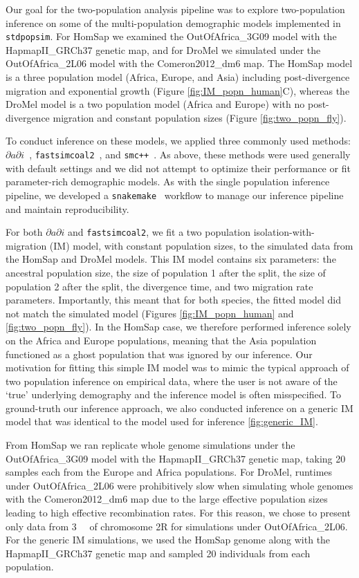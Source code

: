\documentclass[12pt,halfline,a4paper]{ouparticle}
\newcommand{\stdpopsim}{\texttt{stdpopsim}\xspace}
\newcommand{\dadi}{$\partial a \partial i$\xspace}
\newcommand{\smcpp}{\texttt{smc++}\xspace}
\newcommand{\fastsimcoal}{\texttt{fastsimcoal2}\xspace}
\begin{document}
Our goal for the two-population analysis pipeline was to explore two-population inference
on some of the multi-population demographic models implemented in \stdpopsim.
For HomSap we examined the OutOfAfrica\_3G09 model with the HapmapII\_GRCh37 genetic map,
and for DroMel we simulated under the OutOfAfrica\_2L06 model with the Comeron2012\_dm6 map.
The HomSap model is a three population model (Africa, Europe, and Asia) including post-divergence
migration and exponential growth (Figure \ref{fig:IM_popn_human}C), whereas the
DroMel model is a two population model (Africa and Europe) with no post-divergence
migration and constant population sizes (Figure \ref{fig:two_popn_fly}).

To conduct inference on these models, we applied three commonly used methods:
\dadi~\citep{gutenkunst2009inferring}, \fastsimcoal~\citep{excoffier2013robust},
and \smcpp~\citep{terhorst2017robust}. As above, these methods were used
generally with default settings and we did not attempt to optimize their performance or fit
parameter-rich demographic models. As with the single population inference pipeline,
we developed a \texttt{snakemake}~\citep{koster2012snakemake} workflow to manage
our inference pipeline and maintain reproducibility.

For both \dadi and \fastsimcoal, we fit a two population
isolation-with-migration (IM) model, with constant population sizes, to the simulated
data from the HomSap and DroMel models. This IM model contains six parameters:
the ancestral population size, the size of population 1 after the split, the size of
population 2 after the split, the divergence time, and two migration rate parameters.
Importantly, this meant that for both species, the
fitted model did not match the simulated model (Figures \ref{fig:IM_popn_human} and \ref{fig:two_popn_fly}).
In the HomSap case, we therefore performed inference solely on the Africa
and Europe populations, meaning that the Asia population functioned as a ghost
population that was ignored by our inference. Our motivation for fitting this simple
IM model was to mimic the typical approach of two population inference on empirical
data, where the user is not aware of the `true' underlying demography and the inference
model is often misspecified. To ground-truth our inference approach, we also conducted
inference on a generic IM model that was identical to the model used for inference \ref{fig:generic_IM}.

From HomSap we ran replicate whole genome simulations under the OutOfAfrica\_3G09 model
with the HapmapII\_GRCh37 genetic map, taking 20 samples each from the Europe and Africa populations.
For DroMel, runtimes under OutOfAfrica\_2L06 were prohibitively slow when simulating whole genomes
with the Comeron2012\_dm6 map due to the large effective population sizes leading to
high effective recombination rates. For this reason, we chose to present only data
from \SI{3}{\mega\byte} of chromosome 2R for simulations under OutOfAfrica\_2L06.
For the generic IM simulations, we used the HomSap genome along with the
HapmapII\_GRCh37 genetic map and sampled 20 individuals from each population.
\end{document}
